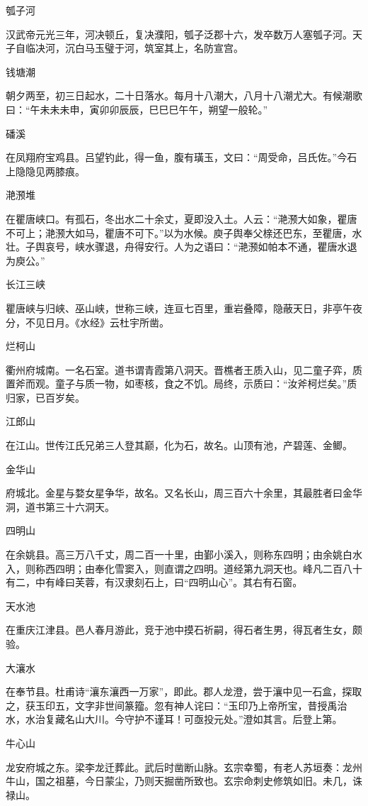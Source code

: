 \documentclass[a4paper,12pt,UTF8,twoside]{ctexbook}
\begin{document}
瓠子河

汉武帝元光三年，河决顿丘，复决濮阳，瓠子泛郡十六，发卒数万人塞瓠子河。天子自临决河，沉白马玉璧于河，筑室其上，名防宣宫。

钱塘潮

朝夕两至，初三日起水，二十日落水。每月十八潮大，八月十八潮尤大。有候潮歌曰：“午未未未申，寅卯卯辰辰，巳巳巳午午，朔望一般轮。”

磻溪

在凤翔府宝鸡县。吕望钓此，得一鱼，腹有璜玉，文曰：“周受命，吕氏佐。”今石上隐隐见两膝痕。

滟滪堆

在瞿唐峡口。有孤石，冬出水二十余丈，夏即没入土。人云：“滟滪大如象，瞿唐不可上；滟滪大如马，瞿唐不可下。”以为水候。庾子舆奉父榇还巴东，至瞿唐，水壮。子舆哀号，峡水骤退，舟得安行。人为之语曰：“滟滪如帕本不通，瞿唐水退为庾公。”

长江三峡

瞿唐峡与归峡、巫山峡，世称三峡，连亘七百里，重岩叠障，隐蔽天日，非亭午夜分，不见日月。《水经》云杜宇所凿。

烂柯山

衢州府城南。一名石室。道书谓青霞第八洞天。晋樵者王质入山，见二童子弈，质置斧而观。童子与质一物，如枣核，食之不饥。局终，示质曰：“汝斧柯烂矣。”质归家，已百岁矣。

江郎山

在江山。世传江氏兄弟三人登其巅，化为石，故名。山顶有池，产碧莲、金鲫。

金华山

府城北。金星与婺女星争华，故名。又名长山，周三百六十余里，其最胜者曰金华洞，道书第三十六洞天。

四明山

在余姚县。高三万八千丈，周二百一十里，由鄞小溪入，则称东四明；由余姚白水入，则称西四明；由奉化雪窦入，则直谓之四明。道经第九洞天也。峰凡二百八十有二，中有峰曰芙蓉，有汉隶刻石上，曰“四明山心”。其右有石窗。

天水池

在重庆江津县。邑人春月游此，竞于池中摸石祈嗣，得石者生男，得瓦者生女，颇验。

大瀼水

在奉节县。杜甫诗“瀼东瀼西一万家”，即此。郡人龙澄，尝于瀼中见一石盒，探取之，获玉印五，文字非世间篆籀。忽有神人诧曰：“玉印乃上帝所宝，昔授禹治水，水治复藏名山大川。今守护不谨耳！可亟投元处。”澄如其言。后登上第。

牛心山

龙安府城之东。梁李龙迁葬此。武后时凿断山脉。玄宗幸蜀，有老人苏垣奏：龙州牛山，国之祖墓，今日蒙尘，乃则天掘凿所致也。玄宗命刺史修筑如旧。未几，诛禄山。
\end{document}
